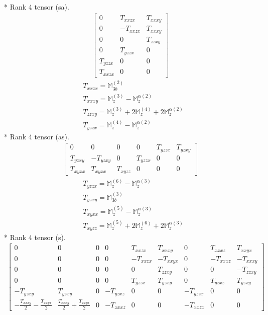 \documentclass[fleqn,8pt,landscape]{jsarticle}
\begin{document}
* Rank 4 tensor (sa).
\begin{align*}
\begin{bmatrix} 0 & T_{xxzx} & T_{xxxy} \\ 0 & - T_{xxzx} & T_{xxxy} \\ 0 & 0 & T_{zzxy} \\ 0 & T_{yzzx} & 0 \\ T_{yzzx} & 0 & 0 \\ T_{xxzx} & 0 & 0 \end{bmatrix}
\end{align*}
\begin{align*}
& T_{xxzx} = \mathbb{M}_{3b}^{(2)} \\
& T_{xxxy} = \mathbb{M}_{z}^{(3)} - \mathbb{M}_{z}^{\alpha(2)} \\
& T_{zzxy} = \mathbb{M}_{z}^{(3)} + 2 \mathbb{M}_{z}^{(4)} + 2 \mathbb{M}_{z}^{\alpha(2)} \\
& T_{yzzx} = \mathbb{M}_{z}^{(4)} - \mathbb{M}_{z}^{\alpha(2)}
\end{align*}
* Rank 4 tensor (as).
\begin{align*}
\begin{bmatrix} 0 & 0 & 0 & 0 & T_{yzzx} & T_{yzxy} \\ T_{yzxy} & - T_{yzxy} & 0 & T_{yzzx} & 0 & 0 \\ T_{xyxx} & T_{xyxx} & T_{xyzz} & 0 & 0 & 0 \end{bmatrix}
\end{align*}
\begin{align*}
& T_{yzzx} = \mathbb{M}_{z}^{(6)} - \mathbb{M}_{z}^{\alpha(3)} \\
& T_{yzxy} = \mathbb{M}_{3b}^{(3)} \\
& T_{xyxx} = \mathbb{M}_{z}^{(5)} - \mathbb{M}_{z}^{\alpha(3)} \\
& T_{xyzz} = \mathbb{M}_{z}^{(5)} + 2 \mathbb{M}_{z}^{(6)} + 2 \mathbb{M}_{z}^{\alpha(3)}
\end{align*}
* Rank 4 tensor (s).
\begin{align*}
\begin{bmatrix} 0 & 0 & 0 & 0 & T_{xxzx} & T_{xxxy} & 0 & T_{xxxz} & T_{xxyx} \\ 0 & 0 & 0 & 0 & - T_{xxzx} & - T_{xxyx} & 0 & - T_{xxxz} & - T_{xxxy} \\ 0 & 0 & 0 & 0 & 0 & T_{zzxy} & 0 & 0 & - T_{zzxy} \\ 0 & 0 & 0 & 0 & T_{yzzx} & T_{yzxy} & 0 & T_{yzxz} & T_{yzxy} \\ - T_{yzxy} & T_{yzxy} & 0 & - T_{yzxz} & 0 & 0 & - T_{yzzx} & 0 & 0 \\ - \frac{T_{xxxy}}{2} - \frac{T_{xxyx}}{2} & \frac{T_{xxxy}}{2} + \frac{T_{xxyx}}{2} & 0 & - T_{xxxz} & 0 & 0 & - T_{xxzx} & 0 & 0 \end{bmatrix}
\end{align*}
\end{document}
